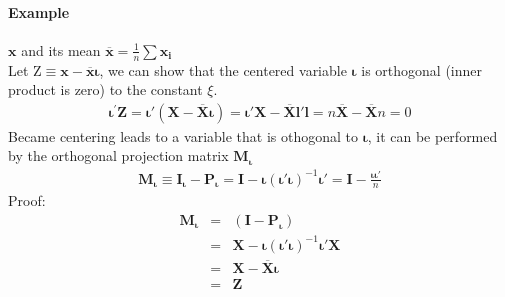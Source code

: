 \paragraph{Example} $\boldsymbol{x}$ and its mean $\overline{\boldsymbol{x}}=\frac{1}{n}\sum \boldsymbol{x_{i}}$\\
Let Z$\equiv\boldsymbol{x}-\overline{\boldsymbol{x}}\boldsymbol{\iota}$, we can show that the centered variable $\boldsymbol{\iota}$ is orthogonal (inner product is zero) to the constant $\xi$.
\begin{eqnarray*}
\boldsymbol{\iota^{'}Z}=\boldsymbol{\iota'}(\boldsymbol{X}-\overline{\boldsymbol{X}}\boldsymbol{\iota})=\boldsymbol{\iota'X}-\overline{\boldsymbol{X}}\boldsymbol{l'l}=n\overline{\boldsymbol{X}}-\overline{\boldsymbol{X}}n=0
\end{eqnarray*}
Became centering leads to a variable that is othogonal to $\boldsymbol{\iota}$, it can be performed by the orthogonal projection matrix $\boldsymbol{M_{\iota}}$
\begin{eqnarray}
\boldsymbol{M_{\iota}}\equiv\boldsymbol{I_{\iota}}-\boldsymbol{P_{\iota}}=\boldsymbol{I}-\boldsymbol{\iota}(\boldsymbol{\iota'\iota})^{-1}\boldsymbol{\iota'}=\boldsymbol{I}-\frac{\boldsymbol{\iota\iota'}}{n}
\end{eqnarray}
Proof:
\begin{eqnarray*}
\boldsymbol{M_{\iota}}&=&(\boldsymbol{I}-\boldsymbol{P_{\iota}})\\
&=&\boldsymbol{X}-\boldsymbol{\iota}(\boldsymbol{\iota'\iota})^{-1}\boldsymbol{\iota'X}\\
&=&\boldsymbol{X}-\overline{\boldsymbol{X}}\boldsymbol{\iota}\\
&=&\boldsymbol{Z}
\end{eqnarray*}
